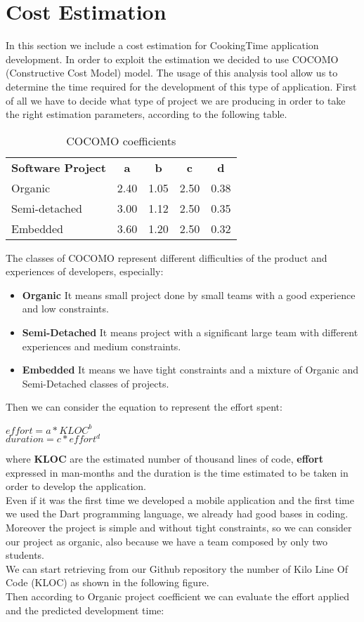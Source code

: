 \chapter{Cost Estimation}
In this section we include a cost estimation for CookingTime application development.
In order to exploit the estimation we decided to use COCOMO (Constructive Cost Model) model.
The usage of this analysis tool allow us to determine the time required for the development of this type of application.
First of all we have to decide what type of project we are producing in order to take the right estimation parameters, according to the following table.\\
\begin{table}[H]
	\centering
	\begin{tabular}{|l|c|c|c|c|}
	\textbf{Software Project}& \textbf{a}& \textbf{b}& \textbf{c}& \textbf{d}\\
	Organic & 2.40 & 1.05 & 2.50 & 0.38 \\
	Semi-detached & 3.00 & 1.12 & 2.50 & 0.35 \\
	Embedded & 3.60 & 1.20 & 2.50 & 0.32 \\
	\end{tabular}
	\caption{COCOMO coefficients}
\end{table}
The classes of COCOMO represent different difficulties of the product and experiences of developers, especially:
\begin{itemize}
	\item \textbf{Organic} It means small project done by small teams with a good experience and low constraints.
	\item \textbf{Semi-Detached} It means project with a significant large team with different experiences and medium constraints.
	\item \textbf{Embedded} It means we have tight constraints and a mixture of Organic and Semi-Detached classes of projects.
\end{itemize}
Then we can consider the equation to represent the effort spent:\\
\begin{center}
$ effort = a * KLOC ^{b}$\\
$ duration = c * effort^{d}$\\
\end{center}
where \textbf{KLOC} are the estimated number of thousand lines of code, \textbf{effort} expressed in man-months and the duration is the time estimated to be taken in order to develop the application.\\
Even if it was the first time we developed a mobile application and the first time we used the Dart programming language, we already had good bases in coding.
Moreover the project is simple and without tight constraints, so we can consider our project as organic, also because we have a team composed by only two students.\\
We can start retrieving from our Github repository the number of Kilo Line Of Code (KLOC) as shown in the following figure.\\
Then according to Organic project coefficient we can evaluate the effort applied and the predicted development time:


